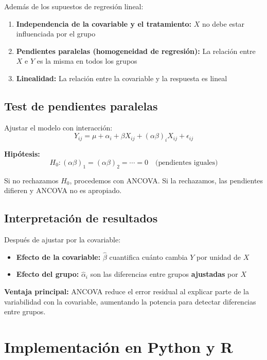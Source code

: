 \documentclass[11pt,a4paper]{article}
\begin{document}
Además de los supuestos de regresión lineal:

\begin{enumerate}
    \item \textbf{Independencia de la covariable y el tratamiento:} $X$ no debe estar influenciada por el grupo
    \item \textbf{Pendientes paralelas (homogeneidad de regresión):} La relación entre $X$ e $Y$ es la misma en todos los grupos
    \item \textbf{Linealidad:} La relación entre la covariable y la respuesta es lineal
\end{enumerate}

\subsection{Test de pendientes paralelas}

Ajustar el modelo con interacción:
\begin{equation}
Y_{ij} = \mu + \alpha_i + \beta X_{ij} + (\alpha \beta)_i X_{ij} + \epsilon_{ij}
\end{equation}

\textbf{Hipótesis:}
\[
H_0: (\alpha\beta)_1 = (\alpha\beta)_2 = \cdots = 0 \quad \text{(pendientes iguales)}
\]

Si no rechazamos $H_0$, procedemos con ANCOVA. Si la rechazamos, las pendientes difieren y ANCOVA no es apropiado.

\subsection{Interpretación de resultados}

Después de ajustar por la covariable:
\begin{itemize}
    \item \textbf{Efecto de la covariable:} $\hat{\beta}$ cuantifica cuánto cambia $Y$ por unidad de $X$
    \item \textbf{Efecto del grupo:} $\hat{\alpha}_i$ son las diferencias entre grupos \textbf{ajustadas} por $X$
\end{itemize}

\textbf{Ventaja principal:} ANCOVA reduce el error residual al explicar parte de la variabilidad con la covariable, aumentando la potencia para detectar diferencias entre grupos.

\section{Implementación en Python y R}
\end{document}
